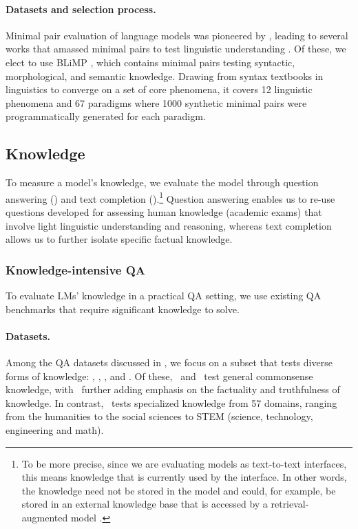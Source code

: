 \paragraph{Datasets and selection process.} 
Minimal pair evaluation of language models was pioneered by \citet{linzen2016assessing}, leading to several works that amassed minimal pairs to test linguistic understanding \citep[][\textit{inter alia}]{linzen2016assessing, warstadt-etal-2020-blimp-benchmark, gauthier2020syntaxgym}.
Of these, we elect to use BLiMP \citep[Benchmark for Linguistic Minimal Pairs;][]{warstadt-etal-2020-blimp-benchmark}, which contains minimal pairs testing syntactic, morphological, and semantic knowledge.
Drawing from syntax textbooks in linguistics to converge on a set of core phenomena, it covers 12 linguistic phenomena and 67 paradigms where 1000 synthetic minimal pairs were programmatically generated for each paradigm.

\hypertarget{knowledge}{\subsection{Knowledge}}
\label{sec:knowledge}
To measure a model's knowledge, we evaluate the model through question answering () and text completion ().\footnote{To be more precise, since we are evaluating models as text-to-text interfaces, this means knowledge that is currently used by the interface. In other words, the knowledge need not be stored in the model and could, for example, be stored in an external knowledge base that is accessed by a retrieval-augmented model \citep{lewis2020rag, yasunaga2021qagnn, yasunaga2022deep}.}
Question answering enables us to re-use questions developed for assessing human knowledge (\eg academic exams) that involve light linguistic understanding and reasoning, whereas text completion allows us to further isolate specific factual knowledge.

\subsubsection{Knowledge-intensive QA}
\label{sec:knowledge-qa}

To evaluate LMs' knowledge in a practical QA setting, we use existing QA benchmarks that require significant knowledge to solve.

\paragraph{Datasets.} 
Among the QA datasets discussed in  , we focus on a subset that tests diverse forms of  knowledge: \hellaswag, \openbookqa, \truthfulqa, and \mmlu.
Of these, \hellaswag~and \openbookqa~test general commonsense knowledge, with \truthfulqa~further adding emphasis on the factuality and truthfulness of knowledge. 
In contrast, \mmlu~tests specialized knowledge from 57 domains, ranging from the humanities to the social sciences to STEM (science, technology, engineering and math).

